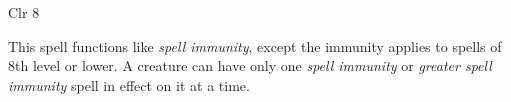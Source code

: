 
\begin{description*}
\item[Level:] Clr 8
\end{description*}

This spell functions like \textit{spell immunity}, except the immunity applies
to spells of 8th level or lower.
A creature can have only one \textit{spell immunity} or \textit{greater spell immunity
}spell in effect on it at a time.